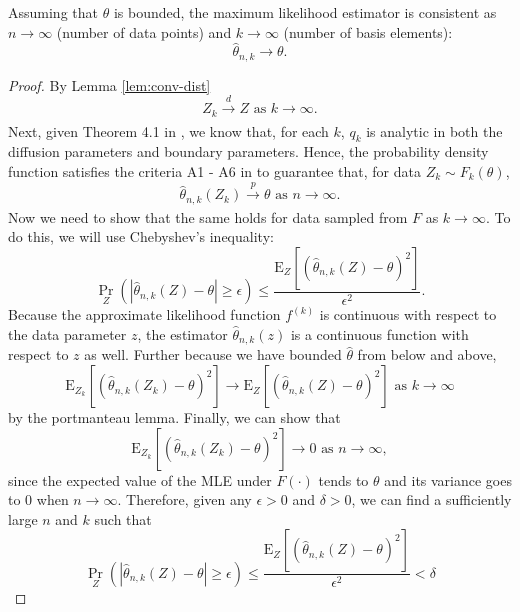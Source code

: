 \begin{lemma}
  Assuming that $\theta$ is bounded, the maximum likelihood estimator
  is consistent as $n \to \infty$ (number of data points) and
  $k \to \infty$ (number of basis elements): \[ \hat{\theta}_{n,k} \to \theta. \]
\end{lemma}
\begin{proof}
  By Lemma \ref{lem:conv-dist}
    \[ Z_k \xrightarrow[]{d} Z \mbox { as } k \to \infty. \] Next,
    given Theorem 4.1 in \cite{singler2008differentiability}, we know
    that, for each $k$, $q_k$ is analytic in both the diffusion
    parameters and boundary parameters. Hence, the probability density
    function satisfies the criteria A1 - A6 in
    \cite{casella2002statistical} to guarantee that, for data
    $Z_{k} \sim F_k(\theta)$,
    \[ \hat{\theta}_{n,k}(Z_k) \xrightarrow[]{p} \theta \mbox{ as } n
      \to \infty. \]
    Now we need to show that the same holds for data sampled from $F$
    as $k \to \infty$. To do this, we will use Chebyshev's inequality:
      \[
    \Pr_{Z}\left( \left| \hat{\theta}_{n,k}(Z) - \theta \right| \geq
      \epsilon \right) \leq \frac{ \mbox{E}_{Z}\left[
        (\hat{\theta}_{n,k}(Z) - \theta)^2 \right] }{ \epsilon^2 }.
  \]
  Because the approximate likelihood function $f^{(k)}$ is continuous
  with respect to the data parameter $z$, the estimator
  $\hat{\theta}_{n,k}(z)$ is a continuous function with respect to $z$
  as well. Further because we have bounded $\hat{\theta}$ from below
  and above,
  \[
    \mbox{E}_{Z_k}\left[ (\hat{\theta}_{n,k}(Z_k) - \theta)^2 \right]
    \to \mbox{E}_{Z}\left[ (\hat{\theta}_{n,k}(Z) - \theta)^2 \right]
    \mbox{ as } k \to \infty
  \]
  by the portmanteau lemma. Finally, we can show that
  \begin{equation}
    \mbox{E}_{Z_k}\left[ (\hat{\theta}_{n,k}(Z_k) - \theta)^2 \right]
    \to 0 \mbox{ as } n \to \infty, \label{eq:var-lim}
  \end{equation}
  since the expected value of the MLE under $F(\cdot)$ tends to
  $\theta$ and its variance goes to 0 when $n \to \infty$. Therefore,
  given any $\epsilon > 0$ and $\delta > 0$, we can find a
  sufficiently large $n$ and $k$ such that
  \[
    \Pr_{Z}\left( \left| \hat{\theta}_{n,k}(Z) - \theta \right| \geq
      \epsilon \right) \leq \frac{ \mbox{E}_{Z}\left[
        (\hat{\theta}_{n,k}(Z) - \theta)^2 \right] }{ \epsilon^2 } < \delta
  \]
\end{proof}

